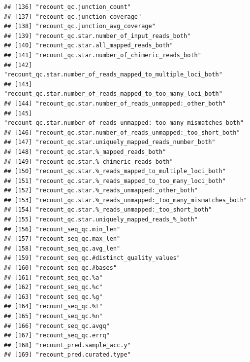 \documentclass[
]{article}
\begin{document}
\begin{verbatim}
## [136] "recount_qc.junction_count"                                         
## [137] "recount_qc.junction_coverage"                                      
## [138] "recount_qc.junction_avg_coverage"                                  
## [139] "recount_qc.star.number_of_input_reads_both"                        
## [140] "recount_qc.star.all_mapped_reads_both"                             
## [141] "recount_qc.star.number_of_chimeric_reads_both"                     
## [142] "recount_qc.star.number_of_reads_mapped_to_multiple_loci_both"      
## [143] "recount_qc.star.number_of_reads_mapped_to_too_many_loci_both"      
## [144] "recount_qc.star.number_of_reads_unmapped:_other_both"              
## [145] "recount_qc.star.number_of_reads_unmapped:_too_many_mismatches_both"
## [146] "recount_qc.star.number_of_reads_unmapped:_too_short_both"          
## [147] "recount_qc.star.uniquely_mapped_reads_number_both"                 
## [148] "recount_qc.star.%_mapped_reads_both"                               
## [149] "recount_qc.star.%_chimeric_reads_both"                             
## [150] "recount_qc.star.%_reads_mapped_to_multiple_loci_both"              
## [151] "recount_qc.star.%_reads_mapped_to_too_many_loci_both"              
## [152] "recount_qc.star.%_reads_unmapped:_other_both"                      
## [153] "recount_qc.star.%_reads_unmapped:_too_many_mismatches_both"        
## [154] "recount_qc.star.%_reads_unmapped:_too_short_both"                  
## [155] "recount_qc.star.uniquely_mapped_reads_%_both"                      
## [156] "recount_seq_qc.min_len"                                            
## [157] "recount_seq_qc.max_len"                                            
## [158] "recount_seq_qc.avg_len"                                            
## [159] "recount_seq_qc.#distinct_quality_values"                           
## [160] "recount_seq_qc.#bases"                                             
## [161] "recount_seq_qc.%a"                                                 
## [162] "recount_seq_qc.%c"                                                 
## [163] "recount_seq_qc.%g"                                                 
## [164] "recount_seq_qc.%t"                                                 
## [165] "recount_seq_qc.%n"                                                 
## [166] "recount_seq_qc.avgq"                                               
## [167] "recount_seq_qc.errq"                                               
## [168] "recount_pred.sample_acc.y"                                         
## [169] "recount_pred.curated.type"                                         

\end{verbatim}
\end{document}
